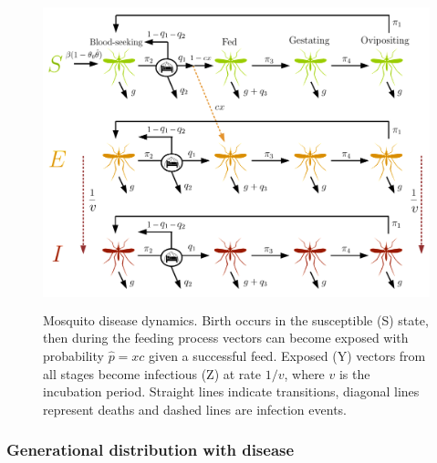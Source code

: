 \begin{figure}[h]
\begin{center}
\includegraphics[height=9cm]{Project/Figures/VectorModel/Diagram_SEI2019.pdf}
\caption{Mosquito disease dynamics. Birth occurs in the susceptible (S) state, then during the feeding process vectors can become exposed with probability $\hat{p}=xc$ given a successful feed. Exposed (Y) vectors from all stages become infectious (Z) at rate $1/v$, where $v$ is the incubation period. Straight lines indicate transitions, diagonal lines represent deaths and dashed lines are infection events.}
\label{fig:diag_vec_SEI}
\end{center}
\end{figure}

\subsubsection{Generational distribution with disease}



